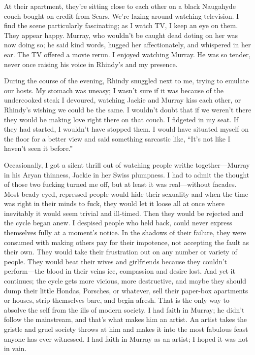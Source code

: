 At their apartment, they're sitting close to each other on a black
Naugahyde couch bought on credit from Sears. We're lazing around
watching television. I find the scene particularly fascinating; as I
watch TV, I keep an eye on them. They appear happy. Murray, who wouldn't
be caught dead doting on her was now doing so; he said kind words,
hugged her affectionately, and whispered in her ear. The TV offered a
movie rerun. I enjoyed watching Murray. He was so tender, never once
raising his voice in Rhindy's and my presence.

During the course of the evening, Rhindy snuggled next to me, trying to
emulate our hosts. My stomach was uneasy; I wasn't sure if it was
because of the undercooked steak I devoured, watching Jackie and Murray
kiss each other, or Rhindy's wishing we could be the same. I wouldn't
doubt that if we weren't there they would be making love right there on
that couch. I fidgeted in my seat. If they had started, I wouldn't have
stopped them. I would have situated myself on the floor for a better
view and said something sarcastic like, ``It's not like I haven't seen
it before.''

Occasionally, I got a silent thrill out of watching people writhe
together---Murray in his Aryan thinness, Jackie in her Swiss plumpness.
I had to admit the thought of those two fucking turned me off, but at
least it was real---without facades. Most beady-eyed, repressed people
would hide their sexuality and when the time was right in their minds to
fuck, they would let it loose all at once where inevitably it would seem
trivial and ill-timed. Then they would be rejected and the cycle began
anew. I despised people who held back, could never express themselves
fully at a moment's notice. In the shadows of their failure, they were
consumed with making others pay for their impotence, not accepting the
fault as their own. They would take their frustration out on any number
or variety of people. They would beat their wives and girlfriends
because they couldn't perform---the blood in their veins ice, compassion
and desire lost. And yet it continues; the cycle gets more vicious, more
destructive, and maybe they should dump their little Hondas, Porsches,
or whatever, sell their paper-box apartments or houses, strip themselves
bare, and begin afresh. That is the only way to absolve the self from
the ills of modern society. I had faith in Murray; he didn't follow the
mainstream, and that's what makes him an artist. An artist takes the
gristle and gruel society throws at him and makes it into the most
fabulous feast anyone has ever witnessed. I had faith in Murray as an
artist; I hoped it was not in vain.

